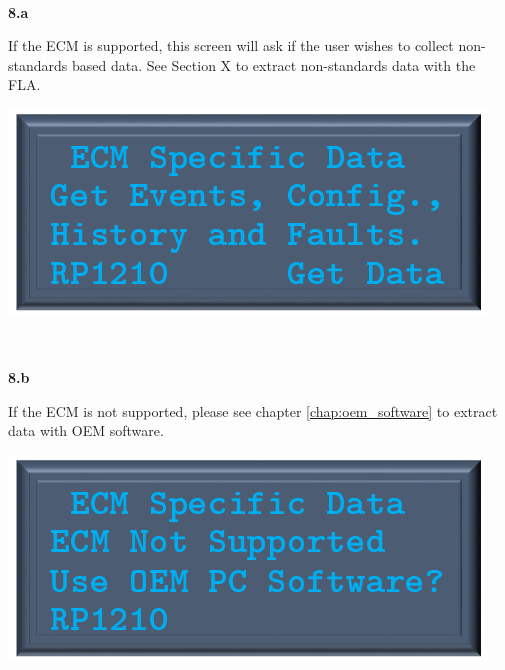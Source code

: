 \documentclass[11pt, oneside]{book}
\begin{document}
\\[\baselineskip]
\noindent\begin{minipage}{0.45\textwidth}%
\begin{center}
\textbf{8.a}\\[\baselineskip]
\end{center}
If the ECM is supported, this screen will ask if the user wishes to collect non-standards based data. See Section X to extract non-standards data with the FLA.
\end{minipage}%
\hfill%
\begin{minipage}{0.45\textwidth}
\includegraphics[width=\linewidth]{../media/pstricks_files/16_ecm_specific_supported}
\end{minipage}
\\[\baselineskip]
\noindent\begin{minipage}{0.45\textwidth}%
\begin{center}
\textbf{8.b}\\[\baselineskip]
\end{center}
If the ECM is not supported, please see chapter \ref{chap:oem_software} to extract data with OEM software.
\end{minipage}%
\hfill%
\begin{minipage}{0.45\textwidth}
\includegraphics[width=\linewidth]{../media/pstricks_files/16_ecm_specific_data}
\end{minipage}
\end{document}
